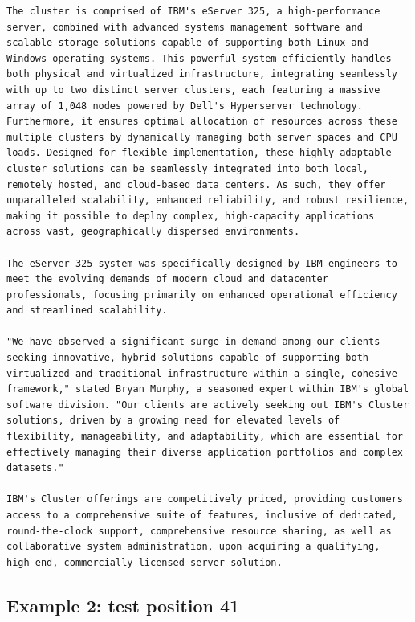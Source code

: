 \begin{Verbatim}
The cluster is comprised of IBM's eServer 325, a high-performance server, combined with advanced systems management software and scalable storage solutions capable of supporting both Linux and Windows operating systems. This powerful system efficiently handles both physical and virtualized infrastructure, integrating seamlessly with up to two distinct server clusters, each featuring a massive array of 1,048 nodes powered by Dell's Hyperserver technology. Furthermore, it ensures optimal allocation of resources across these multiple clusters by dynamically managing both server spaces and CPU loads. Designed for flexible implementation, these highly adaptable cluster solutions can be seamlessly integrated into both local, remotely hosted, and cloud-based data centers. As such, they offer unparalleled scalability, enhanced reliability, and robust resilience, making it possible to deploy complex, high-capacity applications across vast, geographically dispersed environments. 

The eServer 325 system was specifically designed by IBM engineers to meet the evolving demands of modern cloud and datacenter professionals, focusing primarily on enhanced operational efficiency and streamlined scalability. 

"We have observed a significant surge in demand among our clients seeking innovative, hybrid solutions capable of supporting both virtualized and traditional infrastructure within a single, cohesive framework," stated Bryan Murphy, a seasoned expert within IBM's global software division. "Our clients are actively seeking out IBM's Cluster solutions, driven by a growing need for elevated levels of flexibility, manageability, and adaptability, which are essential for effectively managing their diverse application portfolios and complex datasets."

IBM's Cluster offerings are competitively priced, providing customers access to a comprehensive suite of features, inclusive of dedicated, round-the-clock support, comprehensive resource sharing, as well as collaborative system administration, upon acquiring a qualifying, high-end, commercially licensed server solution.
\end{Verbatim}

\subsection{Example 2: test position
41}\label{record-docs-watermarking-qualitative-paper-sir-bira-md-example-2-test-position-41}

